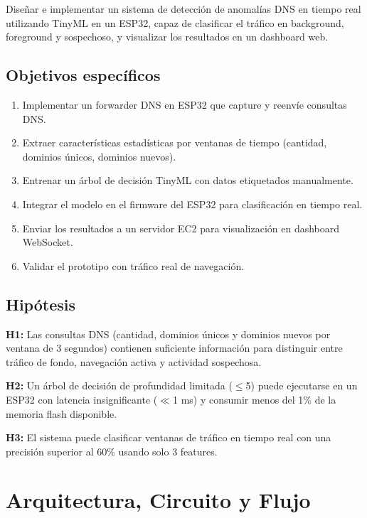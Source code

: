 \documentclass[12pt,a4paper]{article}
\begin{document}
Diseñar e implementar un sistema de detección de anomalías DNS en tiempo real utilizando TinyML en un ESP32, capaz de clasificar el tráfico en background, foreground y sospechoso, y visualizar los resultados en un dashboard web.

\subsection{Objetivos específicos}
\label{sec:objetivos-especificos}

\begin{enumerate}[label=OE\arabic*:]
    \item Implementar un forwarder DNS en ESP32 que capture y reenvíe consultas DNS.
    \item Extraer características estadísticas por ventanas de tiempo (cantidad, dominios únicos, dominios nuevos).
    \item Entrenar un árbol de decisión TinyML con datos etiquetados manualmente.
    \item Integrar el modelo en el firmware del ESP32 para clasificación en tiempo real.
    \item Enviar los resultados a un servidor EC2 para visualización en dashboard WebSocket.
    \item Validar el prototipo con tráfico real de navegación.
\end{enumerate}

\subsection{Hipótesis}
\label{sec:hipotesis}

\textbf{H1:} Las consultas DNS (cantidad, dominios únicos y dominios nuevos por ventana de 3 segundos) contienen suficiente información para distinguir entre tráfico de fondo, navegación activa y actividad sospechosa.

\textbf{H2:} Un árbol de decisión de profundidad limitada ($\leq$5) puede ejecutarse en un ESP32 con latencia insignificante ($\ll$1 ms) y consumir menos del 1\% de la memoria flash disponible.

\textbf{H3:} El sistema puede clasificar ventanas de tráfico en tiempo real con una precisión superior al 60\% usando solo 3 features.

\section{Arquitectura, Circuito y Flujo}
\label{sec:arquitectura}
\end{document}
